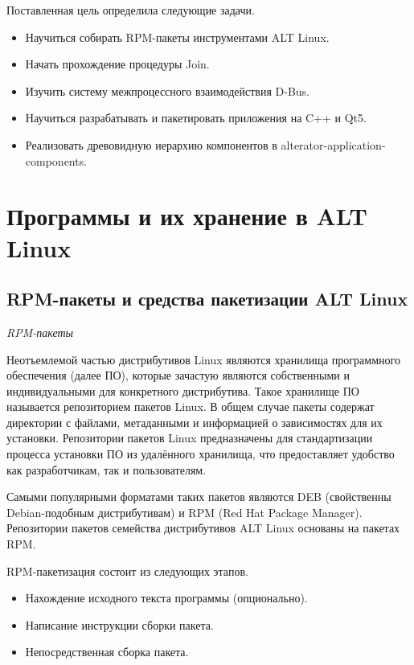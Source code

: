 \documentclass[bachelor, och, pract]{SCWorks}
\begin{document}
Поставленная цель определила следующие задачи.
\begin{itemize}
    \item Научиться собирать RPM-пакеты инструментами ALT Linux.
    \item Начать прохождение процедуры Join.
    \item Изучить систему межпроцессного взаимодействия D-Bus.
    \item Научиться разрабатывать и пакетировать приложения на C++ и Qt5.
    \item Реализовать древовидную иерархию компонентов в alterator-application-components.
\end{itemize}

\section{Программы и их хранение в ALT Linux} %

\subsection{RPM-пакеты и средства пакетизации ALT Linux}

\textit{RPM-пакеты}

Неотъемлемой частью дистрибутивов Linux являются хранилища программного обеспечения (далее ПО), которые зачастую являются собственными и индивидуальными для конкретного дистрибутива.
Такое хранилище ПО называется репозиторием пакетов Linux.
В общем случае пакеты содержат директории с файлами, метаданными и информацией о зависимостях для их установки.
Репозитории пакетов Linux предназначены для стандартизации процесса установки ПО из удалённого хранилища, что предоставляет удобство как разработчикам, так и пользователям.

Самыми популярными форматами таких пакетов являются DEB (свойственны Debian-подобным дистрибутивам) и RPM (Red Hat Package Manager).
Репозитории пакетов семейства дистрибутивов ALT Linux основаны на пакетах RPM.

RPM-пакетизация состоит из следующих этапов.
\begin{itemize}                                                                           
    \item Нахождение исходного текста программы (опционально).                           
    \item Написание инструкции сборки пакета.                                              
    \item Непосредственная сборка пакета.                            
\end{itemize}
\end{document}
